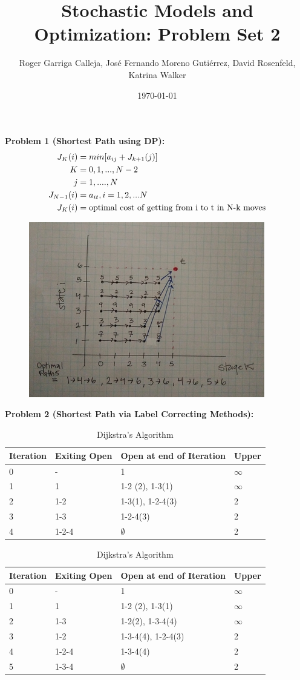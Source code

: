 \documentclass[11pt, english]{article}
\title{Stochastic Models and Optimization: Problem Set 2}
\author{Roger Garriga Calleja, José Fernando Moreno Gutiérrez, David Rosenfeld, Katrina Walker}
\date{\today}
\begin{document}
\maketitle
\textbf{Problem 1 (Shortest Path using DP):}
\\
\begin{align*}
J_K(i) &= min[a_{ij} + J_{k+1}(j)]\\
K & = 0, 1,...,N-2\\
j & = 1,....,N \\
J_{N-1}(i) & = a_{it}, i = 1, 2,...N \\
J_{K}(i)& = \textup{optimal cost of getting from i to t in N-k moves} 
\end{align*}
\begin{center}
\begin{figure}[h]\small
	\centering
	\includegraphics[width=0.7\linewidth]{DP_graph}
\end{figure}
\end{center}
\clearpage
\textbf{Problem 2 (Shortest Path via Label Correcting Methods):}
\begin{table}[h]\small
	\centering
	\caption{Bellman Ford Algorithm}
	\label{my-label}
	\begin{tabular}{llll}
		\hline
		Iteration & Exiting Open & Open at end of Iteration & Upper \\ \hline
		0 & - & 1 & $\infty$ \\ \hline
		1 & 1 & 1-2 (2), 1-3(1) & $\infty$ \\ \hline
		2 & 1-2 & 1-3(1), 1-2-4(3) & 2 \\ \hline
		3 & 1-3 & 1-2-4(3) & 2 \\ \hline
		4 & 1-2-4 & $\emptyset$ & 2 \\ \hline
	\end{tabular}
	\centering
	\caption{Dijkstra’s Algorithm}
	\label{my-label}
	\begin{tabular}{llll}
		\hline
		Iteration & Exiting Open & Open at end of Iteration & Upper \\ \hline
		0 & - & 1 & $\infty$ \\ \hline
		1 & 1 & 1-2 (2), 1-3(1) & $\infty$ \\ \hline
		2 & 1-3 & 1-2(2),  1-3-4(4) & $\infty$ \\ \hline
		3 & 1-2 & 1-3-4(4), 1-2-4(3) & 2 \\ \hline
		4 & 1-2-4 & 1-3-4(4) & 2 \\ \hline
		5 & 1-3-4 & $\emptyset$ & 2 \\ \hline
	\end{tabular}
\end{table}
\end{document}
